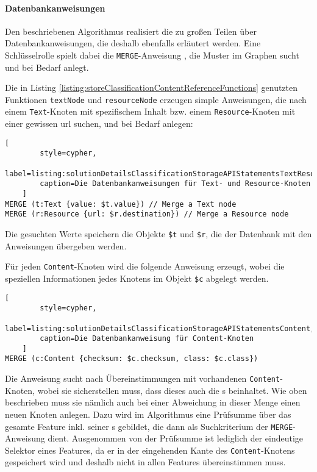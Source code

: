     \paragraph{Datenbankanweisungen}
    Den beschriebenen Algorithmus realisiert die {\classificationStorageAPI}
    zu großen Teilen über Datenbankanweisungen,
    die deshalb ebenfalls erläutert werden.
    Eine Schlüsselrolle spielt dabei die \texttt{MERGE}-Anweisung \cite[Kapitel 3.3.16]{neo4j:documentation},
    die Muster im Graphen sucht und bei Bedarf anlegt.

    Die in Listing \ref{listing:storeClassificationContentReferenceFunctions} genutzten
    Funktionen \texttt{textNode} und \texttt{resourceNode} erzeugen simple Anweisungen,
    die nach einem \texttt{Text}-Knoten mit spezifischem Inhalt bzw.
    einem \texttt{Resource}-Knoten mit einer gewissen \gls{url} suchen,
    und bei Bedarf anlegen:

    \begin{lstlisting}[
        style=cypher,
        label=listing:solutionDetailsClassificationStorageAPIStatementsTextResource,
        caption=Die Datenbankanweisungen für Text- und Resource-Knoten
    ]
MERGE (t:Text {value: $t.value}) // Merge a Text node
MERGE (r:Resource {url: $r.destination}) // Merge a Resource node
    \end{lstlisting}
    
    Die gesuchten Werte speichern die Objekte \verb+$t+ und \verb+$r+,
    die der Datenbank mit den Anweisungen übergeben werden.

    Für jeden \texttt{Content}-Knoten wird die folgende Anweisung erzeugt,
    wobei die speziellen Informationen jedes Knotens im Objekt \verb+$c+
    abgelegt werden.

    \begin{lstlisting}[
        style=cypher,
        label=listing:solutionDetailsClassificationStorageAPIStatementsContent,
        caption=Die Datenbankanweisung für Content-Knoten
    ]
MERGE (c:Content {checksum: $c.checksum, class: $c.class})
    \end{lstlisting}

    Die Anweisung sucht nach Übereinstimmungen mit vorhandenen \texttt{Content}-Knoten,
    wobei sie sicherstellen muss, dass dieses auch die {\childFeature}s beinhaltet.
    Wie oben beschrieben muss sie nämlich auch bei einer Abweichung in dieser Menge einen neuen Knoten anlegen.
    Dazu wird im Algorithmus  eine Prüfsumme über das gesamte Feature inkl. seiner {\childFeature}s gebildet,
    die dann als Suchkriterium der \texttt{MERGE}-Anweisung dient.
    Ausgenommen von der Prüfsumme ist lediglich der eindeutige Selektor eines Features,
    da er in der eingehenden Kante des \texttt{Content}-Knotens gespeichert wird
    und deshalb nicht in allen Features übereinstimmen muss.

